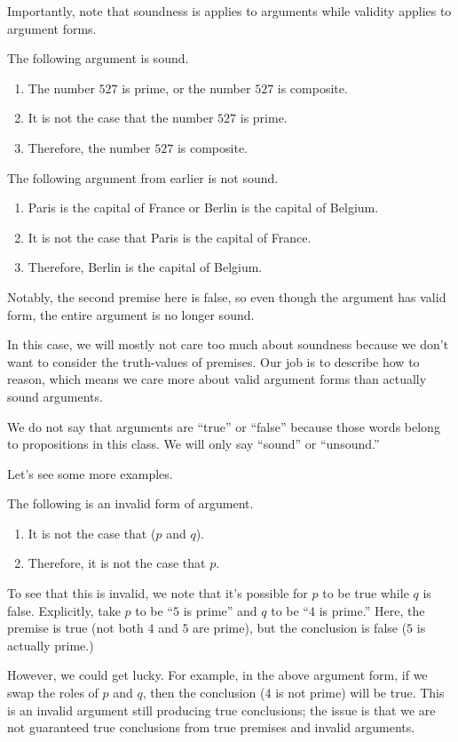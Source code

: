 Importantly, note that soundness is applies to arguments while validity applies to argument forms.
\begin{example}
	The following argument is sound.
	\begin{enumerate}
		\item The number $527$ is prime, or the number $527$ is composite.
		\item It is not the case that the number $527$ is prime.
		\item Therefore, the number $527$ is composite.
	\end{enumerate}
\end{example}
\begin{nex}
	The following argument from earlier is not sound.
	\begin{enumerate}
		\item Paris is the capital of France or Berlin is the capital of Belgium.
		\item It is not the case that Paris is the capital of France.
		\item Therefore, Berlin is the capital of Belgium.
	\end{enumerate}
	Notably, the second premise here is false, so even though the argument has valid form, the entire argument is no longer sound.
\end{nex}
In this case, we will mostly not care too much about soundness because we don't want to consider the truth-values of premises. Our job is to describe how to reason, which means we care more about valid argument forms than actually sound arguments.
\begin{remark}
	We do not say that arguments are ``true'' or ``false'' because those words belong to propositions in this class. We will only say ``sound'' or ``unsound.''
\end{remark}
Let's see some more examples.
\begin{nex}
	The following is an invalid form of argument.
	\begin{enumerate}
		\item It is not the case that ($p$ and $q$).
		\item Therefore, it is not the case that $p$.
	\end{enumerate}
	To see that this is invalid, we note that it's possible for $p$ to be true while $q$ is false. Explicitly, take $p$ to be ``$5$ is prime'' and $q$ to be ``$4$ is prime.'' Here, the premise is true (not both $4$ and $5$ are prime), but the conclusion is false ($5$ is actually prime.)
\end{nex}
However, we could get lucky. For example, in the above argument form, if we swap the roles of $p$ and $q$, then the conclusion ($4$ is not prime) will be true. This is an invalid argument still producing true conclusions; the issue is that we are not guaranteed true conclusions from true premises and invalid arguments.

